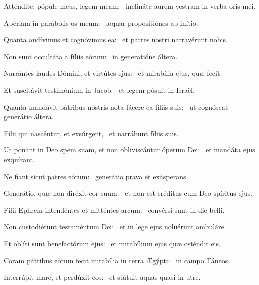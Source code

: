\item Atténdite, pópule meus, legem meam:~\psstar{} inclináte aurem vestram in verba oris mei.

\item Apériam in parábolis os meum:~\psstar{} loquar propositiónes ab inítio.

\item Quanta audívimus et cognóvimus ea:~\psstar{} et patres nostri narravérunt nobis.

\item Non sunt occultáta a fíliis eórum:~\psstar{} in generatióne áltera.

\item Narrántes laudes Dómini, et virtútes ejus:~\psstar{} et mirabília ejus, quæ fecit.

\item Et suscitávit testimónium in Jacob:~\psstar{} et legem pósuit in Israël.

\item Quanta mandávit pátribus nostris nota fácere ea fíliis suis:~\psstar{} ut cognóscat generátio áltera.

\item Fílii qui nascéntur, et exsúrgent,~\psstar{} et narrábunt fíliis suis.

\item Ut ponant in Deo spem suam, et non obliviscántur óperum Dei:~\psstar{} et mandáta ejus exquírant.

\item Ne fiant sicut patres eórum:~\psstar{} generátio prava et exásperans.

\item Generátio, quæ non diréxit cor suum:~\psstar{} et non est créditus cum Deo spíritus ejus.

\item Fílii Ephrem intendéntes et mitténtes arcum:~\psstar{} convérsi sunt in die belli.

\item Non custodiérunt testaméntum Dei:~\psstar{} et in lege ejus noluérunt ambuláre.

\item Et oblíti sunt benefactórum ejus:~\psstar{} et mirabílium ejus quæ osténdit eis.

\item Coram pátribus eórum fecit mirabília in terra Ægýpti:~\psstar{} in campo Táneos.

\item Interrúpit mare, et perdúxit eos:~\psstar{} et státuit aquas quasi in utre.

